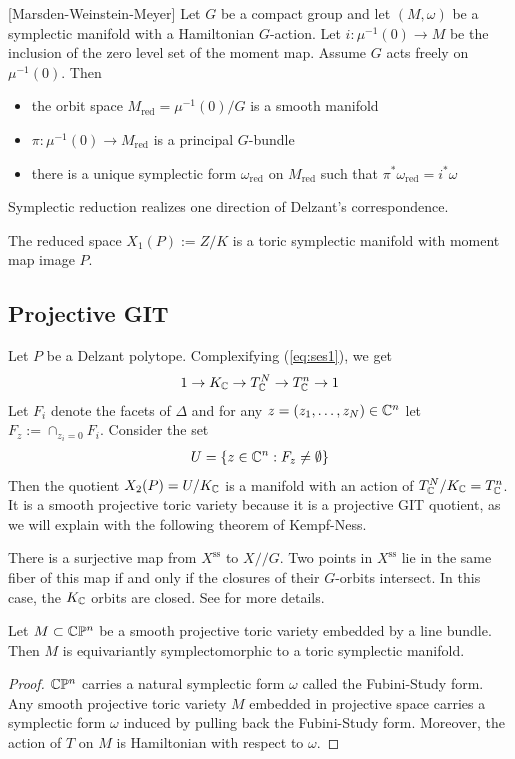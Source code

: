 \begin{theorem}{\label{thm:reduction}}
    [Marsden-Weinstein-Meyer] Let $G$ be a compact group and let $(M,\omega)$ be a symplectic manifold with a
    Hamiltonian $G$-action. Let $i:\mu^{-1}(0)\to M$ be the inclusion of the zero level set of the moment map.
    Assume $G$ acts freely on $\mu^{-1}(0)$. Then \begin{itemize}
        \item the orbit space $M_{\text{red}} = \mu^{-1}(0)/G$ is a smooth manifold
        \item $\pi:\mu^{-1}(0)\to M_{\text{red}}$ is a principal $G$-bundle
        \item there is a unique symplectic form $\omega_{\text{red}}$ on $M_{\text{red}}$ such that $\pi^*\omega_{\text{red}} = i^*\omega$
    \end{itemize}
\end{theorem}
Symplectic reduction realizes one direction of Delzant's correspondence.
\begin{proposition}
    The reduced space $X_1(P) := Z/K$ is a toric symplectic manifold with moment map image $P$.
\end{proposition}

\subsection{Projective GIT}
Let $P$ be a Delzant polytope. Complexifying (\ref{eq:ses1}), we get \begin{align*}
    1\to K_{\mathbb{C}} \to T_{\mathbb{C}}^N \to T_{\mathbb{C}}^n \to 1 
\end{align*} Let $F_i$ denote the facets of $\Delta$ and for any $z = (z_1,\dots,z_N)\in\mathbb{C}^n$ let $F_z := \cap_{z_i = 0}F_i$.
Consider the set \begin{align*}
    U = \{z\in\mathbb{C}^n: F_z \neq \emptyset\}
\end{align*} Then the quotient $X_2(P) = U/K_{\mathbb{C}}$ is a manifold with an action of $T_{\mathbb{C}}^N/K_{\mathbb{C}} = T_{\mathbb{C}}^n$. It is a smooth projective toric variety because it is a projective GIT quotient, as we will explain with the following theorem of Kempf-Ness.

\begin{remark}
    There is a surjective map from $X^{\text{ss}}$ to $X//G$. Two points in $X^{\text{ss}}$
    lie in the same fiber of this map if and only if the closures of their 
    $G$-orbits intersect. In this case, the $K_{\mathbb{C}}$ orbits are closed. See \cite{proudfoot} for more details.
\end{remark}
\begin{proposition}
    Let $M\subset \mathbb{C}\mathbb{P}^n$ be a smooth projective toric variety embedded by a line bundle.
    Then $M$ is equivariantly symplectomorphic to a toric symplectic manifold.
\end{proposition}
\begin{proof}
$\mathbb{C}\mathbb{P}^n$ carries a natural symplectic form $\omega$ 
called the Fubini-Study form. Any smooth projective toric variety $M$ embedded
in projective space carries a symplectic form $\omega$ induced by pulling 
back the Fubini-Study form. Moreover, the action of $T$ on $M$
 is Hamiltonian with respect to $\omega$.
\end{proof}

